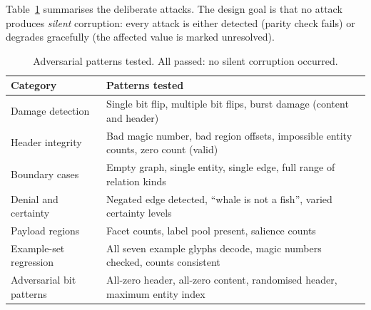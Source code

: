 Table~\ref{tab:redteam} summarises the deliberate attacks. The design goal is that no attack produces \textit{silent} corruption: every attack is either detected (parity check fails) or degrades gracefully (the affected value is marked unresolved).

\begin{table}[ht]
\centering
\caption{Adversarial patterns tested. All passed: no silent corruption occurred.}
\label{tab:redteam}
\begin{tabular}{lp{}}
\toprule
Category & Patterns tested \\
\midrule
Damage detection & Single bit flip, multiple bit flips, burst damage (content and header) \\
Header integrity & Bad magic number, bad region offsets, impossible entity counts, zero count (valid) \\
Boundary cases & Empty graph, single entity, single edge, full range of relation kinds \\
Denial and certainty & Negated edge detected, ``whale is not a fish'', varied certainty levels \\
Payload regions & Facet counts, label pool present, salience counts \\
Example-set regression & All seven example glyphs decode, magic numbers checked, counts consistent \\
Adversarial bit patterns & All-zero header, all-zero content, randomised header, maximum entity index \\
\bottomrule
\end{tabular}
\end{table}

